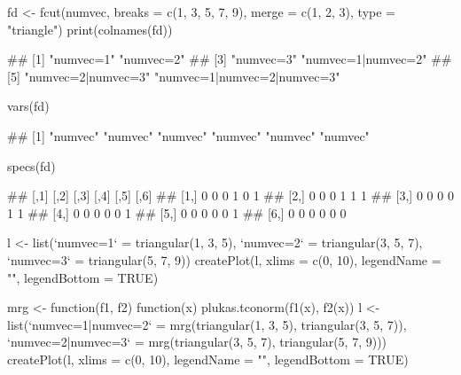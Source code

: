 \documentclass{article}\usepackage[]{graphicx}\usepackage[]{color}
\begin{document}
\begin{Schunk}
% --begin: "fcut.merge2"
\begin{Sinput}
fd <- fcut(numvec, breaks = c(1, 3, 5, 7, 9), merge = c(1, 2, 3), type = "triangle")
print(colnames(fd))
\end{Sinput}
\begin{Soutput}
## [1] "numvec=1"                   "numvec=2"                  
## [3] "numvec=3"                   "numvec=1|numvec=2"         
## [5] "numvec=2|numvec=3"          "numvec=1|numvec=2|numvec=3"
\end{Soutput}
%
% --end: "fcut.merge2"
\end{Schunk}

\begin{Schunk}
% --begin: "fcut.varsspecs"
\begin{Sinput}
vars(fd)
\end{Sinput}
\begin{Soutput}
## [1] "numvec" "numvec" "numvec" "numvec" "numvec" "numvec"
\end{Soutput}
\begin{Sinput}
specs(fd)
\end{Sinput}
\begin{Soutput}
##      [,1] [,2] [,3] [,4] [,5] [,6]
## [1,]    0    0    0    1    0    1
## [2,]    0    0    0    1    1    1
## [3,]    0    0    0    0    1    1
## [4,]    0    0    0    0    0    1
## [5,]    0    0    0    0    0    1
## [6,]    0    0    0    0    0    0
\end{Soutput}
%
% --end: "fcut.varsspecs"
\end{Schunk}


\begin{Schunk}
\begin{Sinput}
l <- list(`numvec=1` = triangular(1, 3, 5), `numvec=2` = triangular(3, 
    5, 7), `numvec=3` = triangular(5, 7, 9))
createPlot(l, xlims = c(0, 10), legendName = "", legendBottom = TRUE)
\end{Sinput}
\end{Schunk}

\begin{Schunk}
\begin{Sinput}
mrg <- function(f1, f2) {
    function(x) {
        plukas.tconorm(f1(x), f2(x))
    }
}
l <- list(`numvec=1|numvec=2` = mrg(triangular(1, 3, 5), triangular(3, 
    5, 7)), `numvec=2|numvec=3` = mrg(triangular(3, 5, 7), triangular(5, 
    7, 9)))
createPlot(l, xlims = c(0, 10), legendName = "", legendBottom = TRUE)
\end{Sinput}
\end{Schunk}
\end{document}
